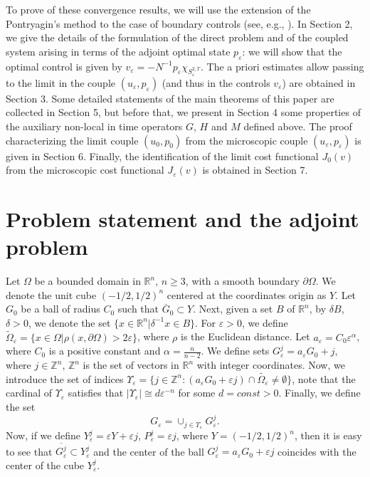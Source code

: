 \documentclass[10pt,a4paper]{amsart}
\numberwithin{equation}{section}
\begin{document}
To prove of these convergence results, we will use the
extension of the Pontryagin's method to the case of boundary controls (see,
e.g., \cite{LionsOpt}). In Section 2, we give the details of the formulation
of the direct problem and of  the coupled system arising in terms of the
adjoint optimal state $p_{\varepsilon }$: we will show that the optimal
control is given by 
$v_{\varepsilon }=-N^{-1}p_{\varepsilon }\chi_{S_{\varepsilon }^{2,T}}$. 
The a priori estimates allow passing to the
limit in the couple $(u_{\varepsilon },p_{\varepsilon })$ (and thus in the
controls $v_{\varepsilon }$) are obtained in Section 3. Some detailed
statements of the main theorems of this paper are collected in Section 5,
but before that, we present in Section 4 some properties of the auxiliary
non-local in time operators $G$, $H$ and $M$ defined above. The proof
characterizing the limit couple $(u_0,p_0)$ from the microscopic couple 
$(u_{\varepsilon },p_{\varepsilon })$ is given in Section 6. Finally, the
identification of the limit cost functional $J_0(v)$ from the microscopic
cost functional $J_{\varepsilon }(v)$ is obtained in Section 7.

\section{Problem statement and the adjoint problem}

Let $\Omega $ be a bounded domain in $\mathbb{R}^n$, $n\geq 3$, with a
smooth boundary $\partial \Omega $. We denote the unit cube $(-1/2,1/2)^n$
centered at the coordinates origin as $Y$. Let $G_0$ be a ball of radius 
$C_0$ such that $\overline{G}_0\subset Y$. Next, given a set $B$ of 
$\mathbb{R}^n$, by $\delta B$, $\delta >0$, we denote the set $\{x\in
\mathbb{R}^n|\delta ^{-1}x\in B\}$. For $\varepsilon >0$, we define 
$\widetilde{\Omega }_{\varepsilon }=\{x\in \Omega |\rho (x,\partial \Omega
)>2\varepsilon \}$, where $\rho $ is the Euclidean distance. 
Let $a_{\varepsilon }=C_0\varepsilon ^{\alpha }$, where $C_0$ is a positive
constant and $\alpha =\frac{n}{n-2}$. We define sets 
$G_{\varepsilon}^{j}=a_{\varepsilon }G_0+j$, where $j\in \mathbb{Z}^n$, $\mathbb{Z}^n$
is the set of vectors in $\mathbb{R}^n$ with integer coordinates. Now, we
introduce the set of indices $\Upsilon _{\varepsilon }=\{j\in \mathbb{Z}
^n:(a_{\varepsilon }G_0+{\varepsilon }j)\cap \widetilde{\Omega
_{\varepsilon }}\neq \emptyset \}$, note that the cardinal of 
$\Upsilon_{\varepsilon }$ satisfies that 
$|\Upsilon _{\varepsilon }|\cong d{\varepsilon }^{-n}$ for some $d=const>0$. 
Finally, we define the set
\[
G_{\varepsilon }=\cup_{j\in \Upsilon _{\varepsilon }}G_{\varepsilon }^{j}.
\]
Now, if we define $Y_{\varepsilon }^{j}={\varepsilon }Y+{\varepsilon }j$,
$P_{\varepsilon }^{j}={\varepsilon }j$, where $Y=(-1/2,1/2)^n$, then it is
easy to see that $\overline{G_{\varepsilon }^{j}}\subset Y_{\varepsilon }^{j}$
and the center of the ball $G_{\varepsilon }^{j}=a_{\varepsilon }G_0+{\varepsilon }j$
coincides with the center of the cube $Y_{\varepsilon }^{j}$.
\end{document}
